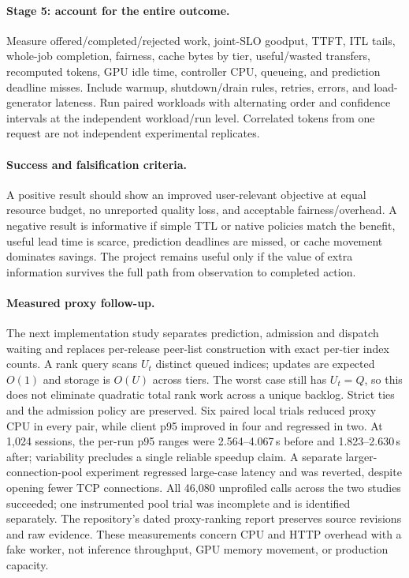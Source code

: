 \paragraph{Stage 5: account for the entire outcome.}
Measure offered/completed/rejected work, joint-SLO goodput, TTFT, ITL tails,
whole-job completion, fairness, cache bytes by tier, useful/wasted transfers,
recomputed tokens, GPU idle time, controller CPU, queueing, and prediction
deadline misses. Include warmup, shutdown/drain rules, retries, errors, and
load-generator lateness. Run paired workloads with alternating order and
confidence intervals at the independent workload/run level. Correlated tokens
from one request are not independent experimental replicates.

\paragraph{Success and falsification criteria.}
A positive result should show an improved user-relevant objective at equal
resource budget, no unreported quality loss, and acceptable fairness/overhead.
A negative result is informative if simple TTL or native policies match the
benefit, useful lead time is scarce, prediction deadlines are missed, or cache
movement dominates savings. The project remains useful only if the value of
extra information survives the full path from observation to completed action.


\paragraph{Measured proxy follow-up.}
The next implementation study separates prediction, admission and dispatch
waiting and replaces per-release peer-list construction with exact per-tier
index counts. A rank query scans $U_t$ distinct queued indices; updates are
expected $O(1)$ and storage is $O(U)$ across tiers. The worst case still has
$U_t=Q$, so this does not eliminate quadratic total rank work across a unique
backlog. Strict ties and the admission policy are preserved.
Six paired local trials reduced proxy CPU in every pair, while client p95
improved in four and regressed in two. At 1,024 sessions, the per-run p95 ranges
were 2.564--4.067\,s before and 1.823--2.630\,s after; variability precludes a
single reliable speedup claim. A separate larger-connection-pool experiment
regressed large-case latency and was reverted, despite opening fewer TCP
connections. All 46,080 unprofiled calls across the two studies succeeded;
one instrumented pool trial was incomplete and is identified separately.
The repository's dated proxy-ranking report preserves source revisions and raw
evidence. These measurements concern CPU and HTTP overhead with a fake worker,
not inference throughput, GPU memory movement, or production capacity.


